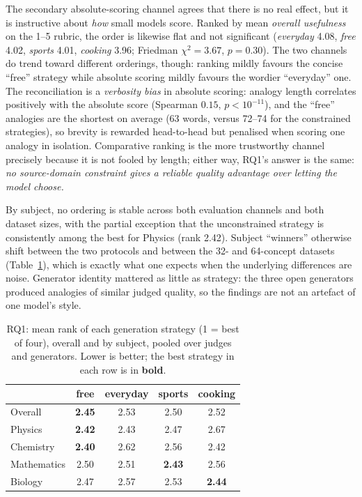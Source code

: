 \documentclass[11pt]{article}
\begin{document}
The secondary absolute-scoring channel agrees that there is no real effect, but it is
instructive about \emph{how} small models score. Ranked by mean \emph{overall usefulness} on
the 1--5 rubric, the order is likewise flat and not significant (\emph{everyday} 4.08,
\emph{free} 4.02, \emph{sports} 4.01, \emph{cooking} 3.96; Friedman $\chi^2 = 3.67$,
$p = 0.30$). The two channels do trend toward different orderings, though: ranking mildly
favours the concise ``free'' strategy while absolute scoring mildly favours the wordier
``everyday'' one. The reconciliation is a \emph{verbosity bias} in absolute scoring: analogy
length correlates positively with the absolute score (Spearman $0.15$, $p < 10^{-11}$), and
the ``free'' analogies are the shortest on average (63 words, versus 72--74 for the
constrained strategies), so brevity is rewarded head-to-head but penalised when scoring one
analogy in isolation. Comparative ranking is the more trustworthy channel precisely because
it is not fooled by length; either way, RQ1's answer is the same: \emph{no source-domain
constraint gives a reliable quality advantage over letting the model choose.}

By subject, no ordering is stable across both evaluation channels and both dataset sizes, with
the partial exception that the unconstrained strategy is consistently among the best for
Physics (rank 2.42). Subject ``winners'' otherwise shift between the two protocols and between
the 32- and 64-concept datasets (Table~\ref{tab:rq1}), which is exactly what one expects when
the underlying differences are noise. Generator identity mattered as little as strategy: the
three open generators produced analogies of similar judged quality, so the findings are not an
artefact of one model's style.

\begin{table}[t]
\centering
\caption{RQ1: mean rank of each generation strategy (1 = best of four), overall and by
subject, pooled over judges and generators. Lower is better; the best strategy in each row
is in \textbf{bold}.}
\label{tab:rq1}
\small
\begin{tabular}{lcccc}
\toprule
 & free & everyday & sports & cooking \\
\midrule
Overall      & \textbf{2.45} & 2.53 & 2.50 & 2.52 \\
Physics      & \textbf{2.42} & 2.43 & 2.47 & 2.67 \\
Chemistry    & \textbf{2.40} & 2.62 & 2.56 & 2.42 \\
Mathematics  & 2.50 & 2.51 & \textbf{2.43} & 2.56 \\
Biology      & 2.47 & 2.57 & 2.53 & \textbf{2.44} \\
\bottomrule
\end{tabular}
\end{table}
\end{document}
